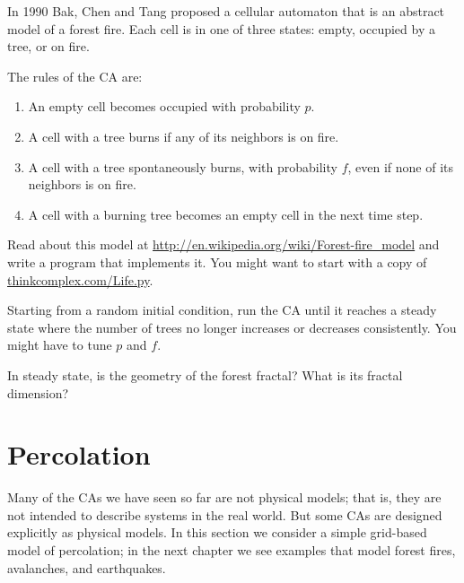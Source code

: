 \documentclass[10pt]{book}
\begin{document}
\begin{exercise}

In 1990 Bak, Chen and Tang proposed a cellular automaton that is
an abstract model of a forest fire.  Each cell is in one of three
states: empty, occupied by a tree, or on fire.

The rules of the CA are:

\begin{enumerate}

\item An empty cell becomes occupied with probability $p$.

\item A cell with a tree burns if any of its neighbors
  is on fire.

\item A cell with a tree spontaneously burns, with
  probability $f$, even if none of its neighbors is on fire.

\item A cell with a burning tree becomes an empty cell in the next
  time step.

\end{enumerate}

Read about this model at
\url{http://en.wikipedia.org/wiki/Forest-fire_model} and write a
program that implements it.  You might want to start with a copy of
\url{thinkcomplex.com/Life.py}.

Starting from a random initial condition, run the CA until it reaches
a steady state where the number of trees no longer increases or
decreases consistently.  You might have to tune $p$ and $f$.

In steady state, is the geometry of the forest fractal?
What is its fractal dimension?

\end{exercise}


\section{Percolation}

Many of the CAs we have seen so far are not physical models; that is,
they are not intended to describe systems in the real world.  But some
CAs are designed explicitly as physical models.  In this section we
consider a simple grid-based model of percolation; in the next chapter
we see examples that model forest fires, avalanches, and earthquakes.
  
\end{document}
